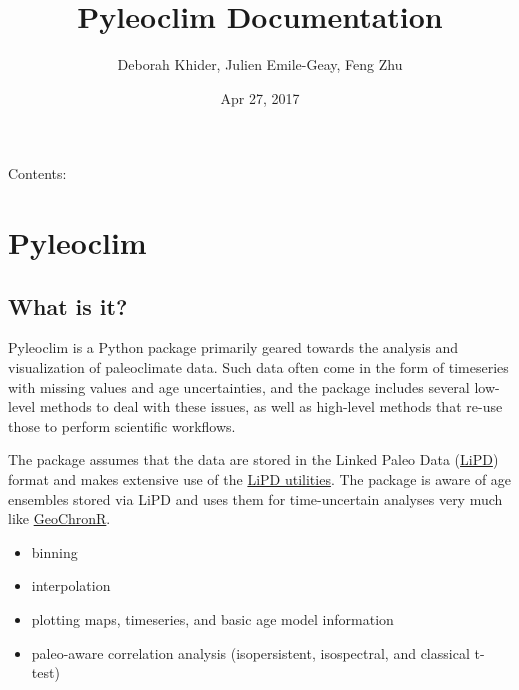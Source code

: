 \documentclass[letterpaper,10pt,english]{sphinxmanual}
\title{Pyleoclim Documentation}
\date{Apr 27, 2017}
\author{Deborah Khider, Julien Emile-Geay, Feng Zhu}
\begin{document}
\maketitle
\sphinxtableofcontents
{}\label{\detokenize{index::doc}}


Contents:


\chapter{Pyleoclim}
\label{\detokenize{Introduction:welcome-to-pyleoclim-s-documentation}}\label{\detokenize{Introduction:pyleoclim}}\label{\detokenize{Introduction::doc}}

\section{What is it?}
\label{\detokenize{Introduction:what-is-it}}
Pyleoclim is a Python package primarily geared towards the analysis and visualization of paleoclimate data.
Such data often come in the form of timeseries with missing values and age uncertainties, and the package
includes several low-level methods to deal with these issues, as well as high-level methods that re-use those
to perform scientific workflows.

The package assumes that the data are stored in the Linked Paleo Data (\href{http://www.clim-past.net/12/1093/2016/}{LiPD})
format and makes extensive use of the \href{http://nickmckay.github.io/LiPD-utilities/}{LiPD utilities}. The package
is aware of age ensembles stored via LiPD and uses them for time-uncertain analyses very much like \href{http://nickmckay.github.io/GeoChronR/}{GeoChronR}.

\begin{itemize}
\item {} 
binning

\item {} 
interpolation

\item {} 
plotting maps, timeseries, and basic age model information

\item {} 
paleo-aware correlation analysis (isopersistent, isospectral, and classical t-test)

\end{itemize}
\end{document}
